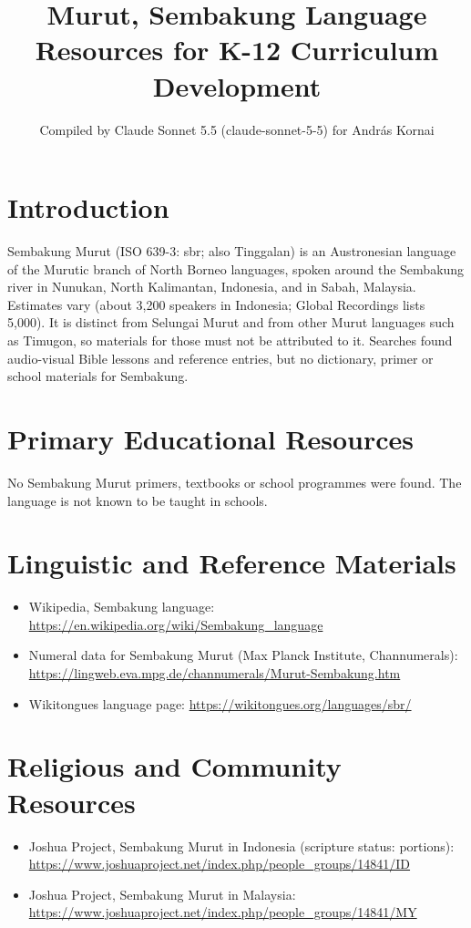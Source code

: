 \documentclass[12pt]{article}
\title{Murut, Sembakung Language Resources for K-12 Curriculum Development}
\author{Compiled by Claude Sonnet 5.5 (claude-sonnet-5-5) for Andr\'as Kornai}
\date{}
\begin{document}
\maketitle

\section{Introduction}
Sembakung Murut (ISO 639-3: sbr; also Tinggalan) is an Austronesian language of the Murutic branch of North Borneo languages, spoken around the Sembakung river in Nunukan, North Kalimantan, Indonesia, and in Sabah, Malaysia. Estimates vary (about 3,200 speakers in Indonesia; Global Recordings lists 5,000). It is distinct from Selungai Murut and from other Murut languages such as Timugon, so materials for those must not be attributed to it. Searches found audio-visual Bible lessons and reference entries, but no dictionary, primer or school materials for Sembakung.

\section{Primary Educational Resources}
No Sembakung Murut primers, textbooks or school programmes were found. The language is not known to be taught in schools.

\section{Linguistic and Reference Materials}
\begin{itemize}
\item Wikipedia, Sembakung language: \url{https://en.wikipedia.org/wiki/Sembakung_language}
\item Numeral data for Sembakung Murut (Max Planck Institute, Channumerals): \url{https://lingweb.eva.mpg.de/channumerals/Murut-Sembakung.htm}
\item Wikitongues language page: \url{https://wikitongues.org/languages/sbr/}
\end{itemize}

\section{Religious and Community Resources}
\begin{itemize}
\item Joshua Project, Sembakung Murut in Indonesia (scripture status: portions): \url{https://www.joshuaproject.net/index.php/people_groups/14841/ID}
\item Joshua Project, Sembakung Murut in Malaysia: \url{https://www.joshuaproject.net/index.php/people_groups/14841/MY}
\end{itemize}
\end{document}
